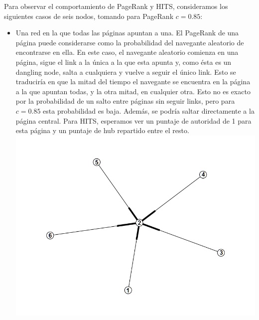 \documentclass[a4paper]{article}
\begin{document}
Para observar el comportamiento de PageRank y HITS, consideramos los siguientes casos de seis nodos, tomando para PageRank $c=0.85$:
\begin{itemize}

\item Una red en la que todas las páginas apuntan a una. El PageRank de una página puede considerarse como la probabilidad del navegante aleatorio de encontrarse en ella. En este caso, el navegante aleatorio comienza en una página, sigue el link a la única a la que esta apunta y, como ésta es un dangling node, salta a cualquiera y vuelve a seguir el único link. Esto se traduciría en que la mitad del tiempo el navegante se encuentra en la página a la que apuntan todas, y la otra mitad, en cualquier otra. Esto no es exacto por la probabilidad de un salto entre páginas sin seguir links, pero para $c=0.85$ esta probabilidad es baja. Además, se podría saltar directamente a la página central. Para HITS, esperamos ver un puntaje de autoridad de 1 para esta página y un puntaje de hub repartido entre el resto. \\
\includegraphics[scale=0.5]{img/todosal2G.png}


\end{itemize}
\end{document}
